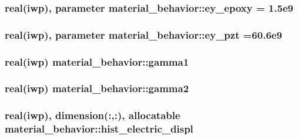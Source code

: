 \subsubsection[{ey\+\_\+epoxy}]{\setlength{\rightskip}{0pt plus 5cm}real(iwp), parameter material\+\_\+behavior\+::ey\+\_\+epoxy = 1.\+5e9}\label{classmaterial__behavior_acecba1d59f399fc0b0aabea4bccee6ce}
\hypertarget{classmaterial__behavior_a5443aaa8c75e639c0e7e610db47365f4}{}
\subsubsection[{ey\+\_\+pzt}]{\setlength{\rightskip}{0pt plus 5cm}real(iwp), parameter material\+\_\+behavior\+::ey\+\_\+pzt =60.\+6e9}\label{classmaterial__behavior_a5443aaa8c75e639c0e7e610db47365f4}
\hypertarget{classmaterial__behavior_a43433da9364d24eb86457ce7d5117774}{}
\subsubsection[{gamma1}]{\setlength{\rightskip}{0pt plus 5cm}real(iwp) material\+\_\+behavior\+::gamma1}\label{classmaterial__behavior_a43433da9364d24eb86457ce7d5117774}
\hypertarget{classmaterial__behavior_af9b472629aed862a5eb7ecd36d27a236}{}
\subsubsection[{gamma2}]{\setlength{\rightskip}{0pt plus 5cm}real(iwp) material\+\_\+behavior\+::gamma2}\label{classmaterial__behavior_af9b472629aed862a5eb7ecd36d27a236}
\hypertarget{classmaterial__behavior_aca4c7b3ca3838cec6677f204faccabfd}{}
\subsubsection[{hist\+\_\+electric\+\_\+displ}]{\setlength{\rightskip}{0pt plus 5cm}real(iwp), dimension(\+:,\+:), allocatable material\+\_\+behavior\+::hist\+\_\+electric\+\_\+displ}\label{classmaterial__behavior_aca4c7b3ca3838cec6677f204faccabfd}
\hypertarget{classmaterial__behavior_ace02b6745ed2cee2b79ed543372bf0ff}{}
